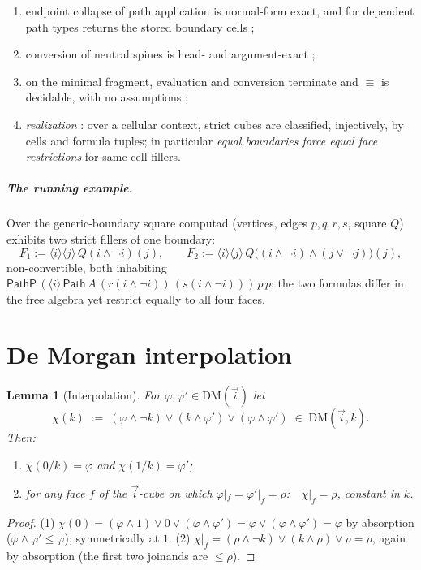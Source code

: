 \documentclass[11pt]{amsart}
\newtheorem{lem}[thm]{Lemma}
\theoremstyle{definition}
\newcommand{\DM}[1]{\mathrm{DM}(#1)}
\newcommand{\aconv}{\equiv}
\newcommand{\Path}{\mathsf{Path}}
\newcommand{\PathP}{\mathsf{PathP}}
\begin{document}
\begin{enumerate}
\item[(K1)] endpoint collapse of path application is normal-form
  exact, and for dependent path types returns the stored boundary
  cells \cite[K1]{Realization};
\item[(K2)] conversion of neutral spines is head- and
  argument-exact \cite[K2]{Sphere};
\item[(K3)] on the minimal fragment, evaluation and conversion
  terminate and $\aconv$ is decidable, with no assumptions
  \cite{Const};
\item[(K4)] \emph{realization} \cite{Realization}: over a cellular
  context, strict cubes are classified, injectively, by cells and
  formula tuples; in particular \emph{equal boundaries force equal
  face restrictions} for same-cell fillers.
\end{enumerate}

\subparagraph*{The running example.}  Over the generic-boundary
square computad (vertices, edges $p,q,r,s$, square $Q$)
\cite{Realization} exhibits two strict fillers of one boundary:
\[
  F_1 := \langle i \rangle \langle j \rangle\,
  Q(i \wedge \neg i)(j),
  \qquad
  F_2 := \langle i \rangle \langle j \rangle\,
  Q\bigl((i \wedge \neg i) \wedge (j \vee \neg j)\bigr)(j),
\]
non-convertible, both inhabiting
$\PathP\,(\langle i \rangle\,
\Path\,A\,(r(i \wedge \neg i))\,(s(i \wedge \neg i)))\,p\,p$:
the two formulas differ in the free algebra yet restrict equally to
all four faces.

\section{De Morgan interpolation}
\label{sec:interp}

\begin{lem}[Interpolation]\label{lem:interp}
  For $\varphi, \varphi' \in \DM{\vec i}$ let
  \[
    \chi(k) \;:=\; (\varphi \wedge \neg k) \vee
    (k \wedge \varphi') \vee (\varphi \wedge \varphi')
    \;\in\; \DM{\vec i, k}.
  \]
  Then:
  \begin{enumerate}
  \item $\chi(0/k) = \varphi$ and $\chi(1/k) = \varphi'$;
  \item for any face $f$ of the $\vec i$-cube on which
    $\varphi|_f = \varphi'|_f = \rho$:\ \ $\chi|_f = \rho$,
    constant in $k$.
  \end{enumerate}
\end{lem}
\begin{proof}
  (1) $\chi(0) = (\varphi \wedge 1) \vee 0 \vee (\varphi \wedge
  \varphi') = \varphi \vee (\varphi \wedge \varphi') = \varphi$ by
  absorption ($\varphi \wedge \varphi' \le \varphi$); symmetrically
  at $1$.  (2) $\chi|_f = (\rho \wedge \neg k) \vee (k \wedge \rho)
  \vee \rho = \rho$, again by absorption (the first two joinands are
  $\le \rho$).
\end{proof}
\end{document}
